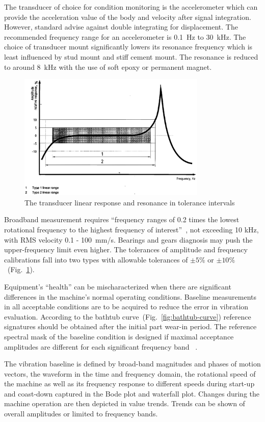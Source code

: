 The transducer of choice for condition monitoring is the accelerometer which can provide the acceleration value of the body and velocity after signal integration. However, standard advise against double integrating for displacement. The recommended frequency range for an accelerometer is 0.1~Hz to 30~kHz. The choice of transducer mount significantly lowers its resonance frequency which is least influenced by stud mount and stiff cement mount. The resonance is reduced to around 8~kHz with the use of soft epoxy or permanent magnet.

\begin{figure}[h]
	\centering
	\includegraphics[width=0.8\textwidth]{assets/analysis/transducer-response.png}
	\caption{The transducer linear response and resonance in tolerance intervals~\cite{noauthor_iso_2002}}
	\label{fig:tranducer-response}
\end{figure}

Broadband measurement requires ``frequency ranges of 0.2 times the lowest rotational frequency to the highest frequency of interest''~\cite{noauthor_iso_2002}, not exceeding 10 kHz, with RMS velocity 0.1 - 100~mm/s. Bearings and gears diagnosis may push the upper-frequency limit even higher. The tolerances of amplitude and frequency calibrations fall into two types with allowable tolerances of $\pm 5 \%$ or $\pm 10 \%$~(Fig.~\ref{fig:tranducer-response}).

Equipment's ``health'' can be mischaracterized when there are significant differences in the machine's normal operating conditions. Baseline measurements in all acceptable conditions are to be acquired to reduce the error in vibration evaluation. According to the bathtub curve~(Fig.~\ref{fig:bathtub-curve}) reference signatures should be obtained after the initial part wear-in period. The reference spectral mask of the baseline condition is designed if maximal acceptance amplitudes are different for each significant frequency band ~\cite{ziaran_technicka_2013}.

The vibration baseline is defined by broad-band magnitudes and phases of motion vectors, the waveform in the time and frequency domain, the rotational speed of the machine as well as its frequency response to different speeds during start-up and coast-down captured in the Bode plot and waterfall plot. Changes during the machine operation are then depicted in value trends. Trends can be shown of overall amplitudes or limited to frequency bands.
